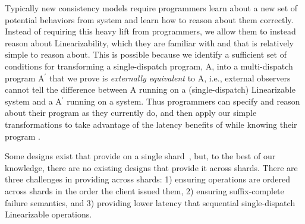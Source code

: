 
Typically new consistency models require programmers learn about a new set of potential behaviors from system and learn how to reason about them correctly.
Instead of requiring this heavy lift from programmers, we allow them to instead reason about Linearizability, which they are familiar with and that is relatively simple to reason about.
This is possible because we identify a sufficient set of conditions for transforming a single-dispatch program, A, into a multi-dispatch program A$^\prime$ that we prove is \textit{externally equivalent} to A, i.e., external observers cannot tell the difference between A running on a (single-dispatch) Linearizable system and a A$^\prime$ running on a \mdl{} system.
Thus programmers can specify and reason about their program as they currently do, and then apply our simple transformations to take advantage of the latency benefits of \mdl{} while knowing their program .


Some designs exist that provide \mdl{} on a single shard~\cite{ongaro_thesis}, but, to the best of our knowledge, there are no existing designs that provide it across shards.
There are three challenges in providing \mdl across shards:
1) ensuring operations are ordered across shards in the order the client issued them,
2) ensuring suffix-complete failure semantics,
and
3) providing lower latency that sequential single-dispatch Linearizable operations.

